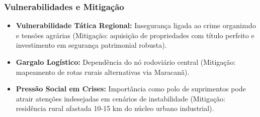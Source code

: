 \subsubsection{Vulnerabilidades e
Mitigação}

\begin{itemize}
\tightlist
\item
  \textbf{Vulnerabilidade Tática Regional:} Insegurança ligada ao crime
  organizado e tensões agrárias (Mitigação: aquisição de propriedades
  com título perfeito e investimento em segurança patrimonial robusta).
\item
  \textbf{Gargalo Logístico:} Dependência do nó rodoviário central
  (Mitigação: mapeamento de rotas rurais alternativas via Maracanã).
\item
  \textbf{Pressão Social em Crises:} Importância como polo de
  suprimentos pode atrair atenções indesejadas em cenários de
  instabilidade (Mitigação: residência rural afastada 10-15 km do núcleo
  urbano industrial).
\end{itemize}

